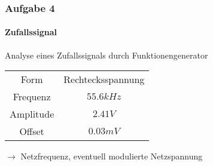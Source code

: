 \begin{frame}
\frametitle{Aufgabe 4}
\framesubtitle{Zufallssignal}
Analyse eines Zufallssignals durch Funktionengenerator
\begin{center}
\begin{tabular}{c | c}
    Form & Rechtecksspannung \\
    Frequenz & $55.6kHz$ \\
    Amplitude & $2.41V$ \\
    Offset & $0.03mV$
\end{tabular}
\end{center}
$\rightarrow$ Netzfrequenz, eventuell modulierte Netzspannung

\end{frame}
